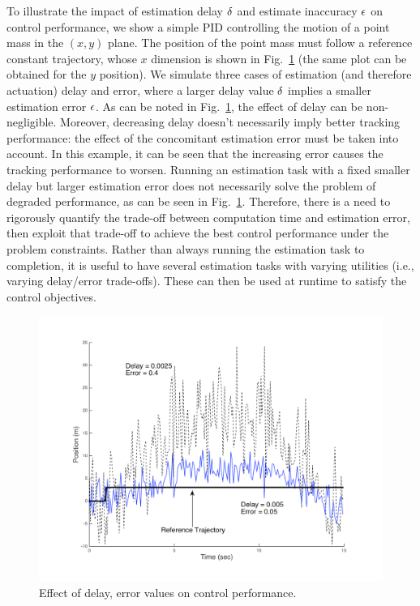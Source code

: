 \begin{exmp}
\label{motivatingExample}
To illustrate the impact of estimation delay $\delta$ and estimate inaccuracy $\epsilon$ on control performance, we show a simple PID controlling the motion of a point mass in the $(x,y)$ plane.
The position of the point mass must follow a reference constant trajectory, whose $x$ dimension is shown in Fig.~\ref{fig:toyplot} (the same plot can be obtained for the $y$ position).
We simulate three cases of estimation (and therefore actuation) delay and error, where a larger delay value $\delta$ implies a smaller estimation error $\epsilon$.
As can be noted in Fig.~\ref{fig:toyplot}, the effect of delay can be non-negligible.
Moreover, decreasing delay doesn't necessarily imply better tracking performance: the effect of the concomitant estimation error must be taken into account. 
In this example, it can be seen that the increasing error causes the tracking performance to worsen.
Running an estimation task with a fixed smaller delay but larger estimation error does not necessarily solve the problem of degraded performance, as can be seen in Fig.~\ref{fig:toyplot}.
Therefore, there is a need to rigorously quantify the trade-off between computation time and estimation error, then exploit that trade-off to achieve the best control performance under the problem constraints.
Rather than always running the estimation task to completion, it is useful to have several estimation tasks with varying utilities (i.e., varying delay/error trade-offs).
These can then be used at runtime to satisfy the control objectives.
\exmend

\begin{figure}[t]
\centering
\includegraphics[scale=0.3]{figures/toyplot}
\vspace{-10pt}
\caption{Effect of delay, error values on control performance.}
\vspace{-10pt}
\label{fig:toyplot}
\end{figure}
\end{exmp}

